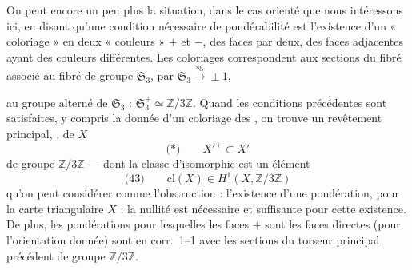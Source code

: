 \documentclass[11pt,a4paper]{article}
\begin{document}
On peut \struck{\ill{}}  encore un peu plus la
situation, dans le cas orienté que nous intéressons ici, en disant qu'une
condition nécessaire de pondérabilité est l'existence d'un « coloriage »
en deux « couleurs » $+$ et $-$, des faces par deux, des faces adjacentes
ayant des couleurs différentes. Les coloriages correspondent aux sections du
fibré  associé au fibré de groupe
$\mathfrak{S}_3$, par $\mathfrak{S}_3 \xrightarrow{\ \mathrm{sg}\ } \pm 1$,
  \ill{}

au groupe alterné de $\mathfrak{S}_3$ : $\mathfrak{S}_3^{+} \simeq \mathbb{Z}/3\mathbb{Z}$.
Quand  les conditions précédentes sont satisfaites, y compris la
donnée d'un  coloriage des \struck{\ill{}}, on trouve un revêtement
principal, 
, de $X$
\[
  \text{(*)} \qquad X'^{+} \subset X'
\]
de groupe $\mathbb{Z}/3\mathbb{Z}$ --- dont la classe d'isomorphie est un élément
\[
  \text{(43)} \qquad \mathrm{cl}(X) \in H^1(X, \mathbb{Z}/3\mathbb{Z})
\]
qu'on peut considérer comme l'obstruction : l'existence d'une pondération, pour
la carte triangulaire $X$ : la nullité est nécessaire et suffisante pour cette
existence. De plus, les pondérations pour lesquelles les faces $+$ sont les faces
directes (pour l'orientation donnée) sont en corr.\ 1--1 avec les sections du
 torseur principal précédent de groupe $\mathbb{Z}/3\mathbb{Z}$.
\end{document}

